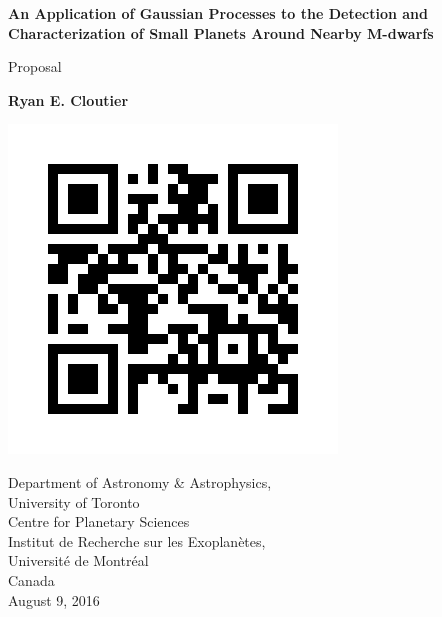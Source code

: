 \begin{titlepage}
    \begin{center}
        \vspace*{1cm}
        
        \Huge
	\textbf{An Application of Gaussian Processes to the Detection 
	and Characterization of Small Planets Around Nearby M-dwarfs}        

        \vspace{0.5cm}
        \LARGE
        Proposal
        
        \vspace{1.5cm}
        
        \textbf{Ryan E. Cloutier}
        
        
        
        \vspace{0.7cm}
        
        \includegraphics[scale=.5]{figures/static_qr_code_without_logo.jpg}
        
	\vfill

        \Large
        Department of Astronomy \& Astrophysics,\\University of Toronto\\
	Centre for Planetary Sciences\\
	Institut de Recherche sur les Exoplan\`{e}tes,\\Universit\'{e} de Montr\'{e}al\\
        Canada\\
        August 9, 2016
        
    \end{center}
\end{titlepage}
